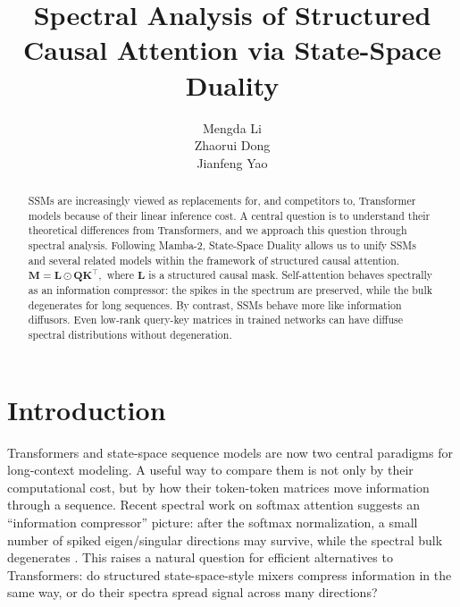 \documentclass{article}
\title{Spectral Analysis of Structured Causal Attention via State-Space Duality}
\author{Mengda Li \\
       \And
       Zhaorui Dong \\
       \And
       Jianfeng Yao}
\newcommand{\hadamard}{\mathbin{\odot}}
\newcommand{\bM}{\mathbf{M}}
\newcommand{\bL}{\mathbf{L}}
\newcommand{\bQ}{\mathbf{Q}}
\newcommand{\bK}{\mathbf{K}}
\theoremstyle{remark}
\begin{document}
\maketitle

\begin{abstract}
{
SSMs are increasingly viewed as replacements for, and competitors to,
Transformer models because of their linear inference cost.  A central question
is to understand their theoretical differences from Transformers, and we
approach this question through spectral analysis.  Following Mamba-2,
State-Space Duality allows us to unify SSMs and several related models within
the framework of structured causal attention.
}
\(
        \bM=\bL\hadamard \bQ\bK^\top,
\)
where $\bL$ is a structured causal mask.  
{
Self-attention behaves spectrally as an information compressor: the spikes in
the spectrum are preserved, while the bulk degenerates for long sequences.
By contrast, SSMs behave more like information diffusors.  Even low-rank
query-key matrices in trained networks can have diffuse spectral distributions
without degeneration.
}
\end{abstract}

\section{Introduction}
Transformers and state-space sequence models are now two central paradigms for
long-context modeling.  A useful way to compare them is not only by their
computational cost, but by how their token-token matrices move information
through a sequence.  Recent spectral work on softmax attention suggests an
``information compressor'' picture: after the softmax normalization, a small
number of spiked eigen/singular directions may survive, while the spectral bulk
degenerates \citep{li:2026spectral}.  This raises a natural
question for efficient alternatives to Transformers: do structured
state-space-style mixers compress information in the same way, or do their
spectra spread signal across many directions?
\end{document}
